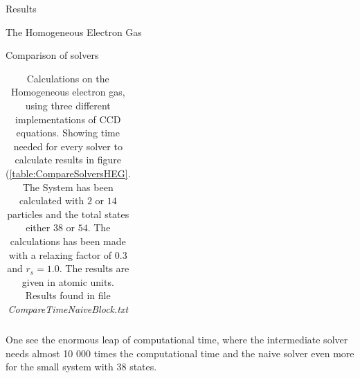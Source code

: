 \documentclass[twoside,english]{uiofysmaster}
\begin{document}
\begin{chapter}{Results}
\begin{section}{The Homogeneous Electron Gas}
\begin{subsection}{Comparison of solvers}
\begin{table}[H]
\begin{center}
\begin{tabular}[center]{l | c  c  c  r}
					\end{tabular}
				\end{center}
				\caption{Calculations on the Homogeneous electron gas, using three different implementations of CCD equations. Showing time needed for every solver to calculate results in figure (\ref{table:CompareSolversHEG}. The System has been calculated with $2$ or $14$ particles and the total states either $38$ or $54$. The calculations has been made with a relaxing factor of $0.3$ and $r_s = 1.0$. The results are given in atomic units. Results found in file \textit{CompareTimeNaiveBlock.txt} \cite{WholmenGithub}}
				\label{table:CompareSolversTimeHEG}
			\end{table}
			One see the enormous leap of computational time, where the intermediate solver needs almost 10 000 times the computational time and the naive solver even more for the small system with $38$ states. 
		\end{subsection}
 		

\end{section}
\end{chapter}
\end{document}
